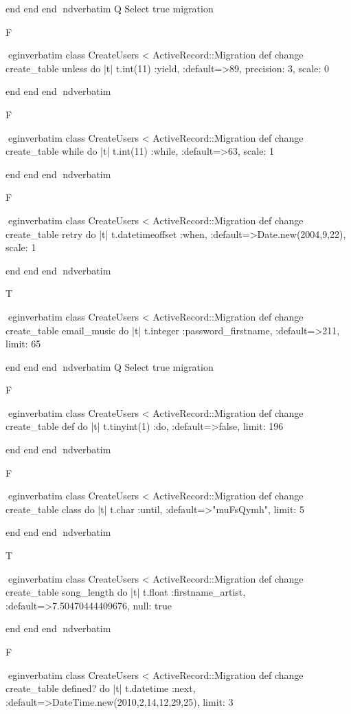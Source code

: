     end 
  end 
end
nd{verbatim}
Q
 Select true migration

F

egin{verbatim}
 class CreateUsers < ActiveRecord::Migration 
  def change 
    create_table unless do |t| 
      t.int(11) :yield, :default=>89, precision: 3, scale: 0
    
    end 
  end 
end
nd{verbatim}

F

egin{verbatim}
 class CreateUsers < ActiveRecord::Migration 
  def change 
    create_table while do |t| 
      t.int(11) :while, :default=>63, scale: 1
    
    end 
  end 
end
nd{verbatim}

F

egin{verbatim}
 class CreateUsers < ActiveRecord::Migration 
  def change 
    create_table retry do |t| 
      t.datetimeoffset :when, :default=>Date.new(2004,9,22), scale: 1
    
    end 
  end 
end
nd{verbatim}

T

egin{verbatim}
 class CreateUsers < ActiveRecord::Migration 
  def change 
    create_table email_music do |t| 
      t.integer :password_firstname, :default=>211, limit: 65
    
    end 
  end 
end
nd{verbatim}
Q
 Select true migration

F

egin{verbatim}
 class CreateUsers < ActiveRecord::Migration 
  def change 
    create_table def do |t| 
      t.tinyint(1) :do, :default=>false, limit: 196
    
    end 
  end 
end
nd{verbatim}

F

egin{verbatim}
 class CreateUsers < ActiveRecord::Migration 
  def change 
    create_table class do |t| 
      t.char :until, :default=>"muFsQymh", limit: 5
    
    end 
  end 
end
nd{verbatim}

T

egin{verbatim}
 class CreateUsers < ActiveRecord::Migration 
  def change 
    create_table song_length do |t| 
      t.float :firstname_artist, :default=>7.50470444409676, null: true
    
    end 
  end 
end
nd{verbatim}

F

egin{verbatim}
 class CreateUsers < ActiveRecord::Migration 
  def change 
    create_table defined? do |t| 
      t.datetime :next, :default=>DateTime.new(2010,2,14,12,29,25), limit: 3
    
